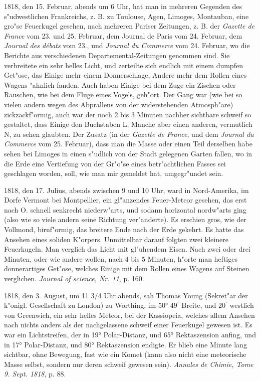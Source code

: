 \documentclass[a4paper, 11pt, oneside, polutonikogreek, german]{article}
\begin{document}
1818, den 15. Februar, abends um 6 Uhr, hat man in mehreren Gegenden des s"udwestlichen Frankreichs, z. B. zu Toulouse, Agen, Limoges, Montauban, eine gro"se Feuerkugel gesehen, nach mehreren Pariser Zeitungen, z. B. der \emph{Gazette de France} vom 23. und 25. Februar, dem Journal de Paris vom 24. Februar, dem \emph{Journal des débats} vom 23., und \emph{Journal du Commerce} vom 24. Februar, wo die Berichte aus verschiedenen Departemental-Zeitungen genommen sind. Sie verbreitete ein sehr helles Licht, und zerteilte sich endlich mit einem dumpfen Get"ose, das Einige mehr einem Donnerschlage, Andere mehr dem Rollen eines Wagens "ahnlich fanden. Auch haben Einige bei dem Zuge ein Zischen oder Rauschen, wie bei dem Fluge eines Vogels, geh"ort. Der Gang war (wie bei so vielen andern wegen des Abprallens von der widerstehenden Atmosph"are) zickzackf"ormig, auch war der noch 2 bis 3 Minuten nachher sichtbare schweif so gestaltet, dass Einige den Buchstaben L, Manche aber einen anderen, vermutlich N, zu sehen glaubten. Der Zusatz (in der \emph{Gazette de France}, und dem \emph{Journal du Commerce} vom 25. Februar), dass man die Masse oder einen Teil derselben habe sehen bei Limoges in einen s"udlich von der Stadt gelegenen Garten fallen, wo in die Erde eine Vertiefung von der Gr"o"se eines betr"achtlichen Fasses sei geschlagen worden, soll, wie man mir gemeldet hat, umgegr"undet sein.

1818, den 17. Julius, abends zwischen 9 und 10 Uhr, ward in Nord-Amerika, im Dorfe Vermont bei Montpellier, ein gl"anzendes Feuer-Meteor gesehen, das erst nach O. schnell senkrecht niederw"arts, und sodann horizontal nordw"arts ging (also wie so viele andern seine Richtung ver"anderte). Es erschien gros, wie der Vollmond, birnf"ormig, das breitere Ende nach der Erde gekehrt. Es hatte das Ansehen eines soliden K"orpers. Unmittelbar darauf folgten zwei kleinere Feuerkugeln. Man verglich das Licht mit gl"uhendem Eisen. Nach zwei oder drei Minuten, oder wie andere wollen, nach 4 bis 5 Minuten, h"orte man heftiges donnerartiges Get"ose, welches Einige mit dem Rollen eines Wagens auf Steinen verglichen. \emph{Journal of science, Nr. 11}, p. 160.

1818, den 3. August, um 11 3/4 Uhr abends, sah Thomas Young (Sekret"ar der k"onigl. Gesellschaft zu London) zu Worthing, im 50° 49$^{\prime}$ Breite, und 20$^{\prime}$ westlich von Greenwich, ein sehr helles Meteor, bei der Kassiopeia, welches allem Ansehen nach nichts anders als der nachgelassene schweif einer Feuerkugel gewesen ist. Es war ein Lichtstreifen, der in 19° Polar-Distanz, und 65° Rektaszension anfing, und in 17° Polar-Distanz, und 80° Rektaszension endigte. Er blieb eine Minute lang sichtbar, ohne Bewegung, fast wie ein Komet (kann also nicht eine meteorische Masse selbst, sondern nur deren schweif gewesen sein). \emph{Annales de Chimie, Tome 9. Sept. 1818}, p. 88.
\end{document}
